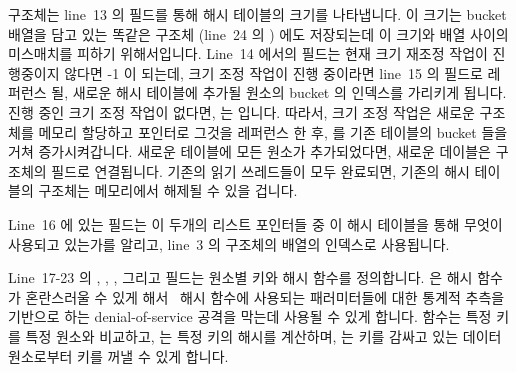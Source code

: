  구조체는 line~13 의  필드를 통해 해시 테이블의 크기를
나타냅니다.
이 크기는 bucket 배열을 담고 있는 똑같은 구조체 (line~24 의 )
에도 저장되는데 이 크기와 배열 사이의 미스매치를 피하기 위해서입니다.
Line~14 에서의  필드는 현재 크기 재조정 작업이 진행중이지
않다면 -1 이 되는데, 크기 조정 작업이 진행 중이라면 line~15 의 
필드로 레퍼런스 될, 새로운 해시 테이블에 추가될 원소의 bucket 의 인덱스를
가리키게 됩니다.
진행 중인 크기 조정 작업이 없다면,  는  입니다.
따라서, 크기 조정 작업은 새로운  구조체를 메모리 할당하고 
포인터로 그것을 레퍼런스 한 후,  를 기존 테이블의 bucket
들을 거쳐 증가시켜갑니다.
새로운 테이블에 모든 원소가 추가되었다면, 새로운 데이블은  구조체의
 필드로 연결됩니다.
기존의 읽기 쓰레드들이 모두 완료되면, 기존의 해시 테이블의  구조체는
메모리에서 해제될 수 있을 겁니다.

Line~16 에 있는  필드는 이 두개의 리스트 포인터들 중 이 해시
테이블을 통해 무엇이 사용되고 있는가를 알리고, line~3 의 
구조체의  배열의 인덱스로 사용됩니다.

Line~17-23 의 , , ,
그리고  필드는 원소별 키와 해시 함수를 정의합니다.
 은 해시 함수가 혼란스러울 수 있게
해서~\cite{McKenney89c,McKenney90,McKenney91} 해시 함수에 사용되는 패러미터들에
대한 통계적 추측을 기반으로 하는 denial-of-service 공격을 막는데 사용될 수 있게
합니다.
 함수는 특정 키를 특정 원소와 비교하고,  는
특정 키의 해시를 계산하며,  는 키를 감싸고 있는 데이터
원소로부터 키를 꺼낼 수 있게 합니다.

